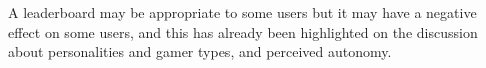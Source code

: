 A leaderboard may be appropriate to some users but it may have a negative effect on some users, and this has already been highlighted on the discussion about personalities and gamer types, and perceived autonomy. 

